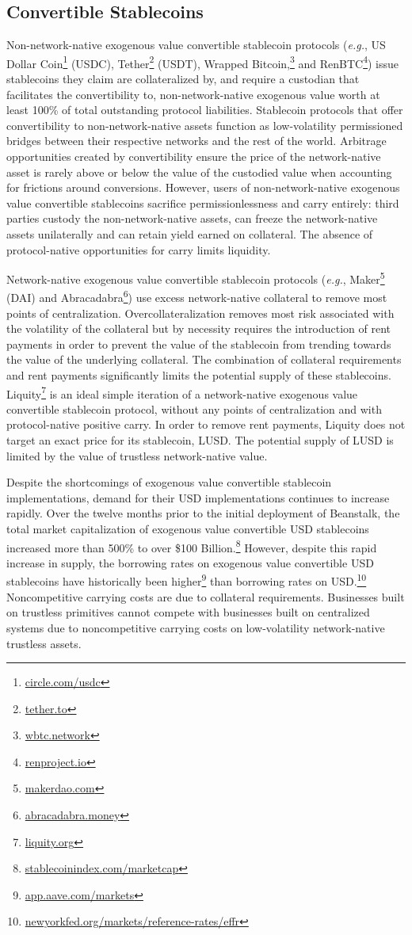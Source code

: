 \documentclass[tikz]{article}
\newcommand{\term}[1]{\textsl{#1}}
\newcommand{\fref}[1]{\footnote{\href{http://#1}{#1}}}
\begin{document}
\subsection{Convertible Stablecoins}
Non-network-native exogenous value convertible stablecoin protocols (\term{e.g.}, US Dollar Coin\fref{circle.com/usdc} (USDC), Tether\fref{tether.to} (USDT), Wrapped Bitcoin,\fref{wbtc.network} and RenBTC\fref{renproject.io}) issue stablecoins they claim are collateralized by, and require a custodian that facilitates the convertibility to, non-network-native exogenous value worth at least 100\% of total outstanding protocol liabilities. Stablecoin protocols that offer convertibility to non-network-native assets function as low-volatility permissioned bridges between their respective networks and the rest of the world. Arbitrage opportunities created by convertibility ensure the price of the network-native asset is rarely above or below the value of the custodied value when accounting for frictions around conversions. However, users of non-network-native exogenous value convertible stablecoins sacrifice permissionlessness and carry entirely: third parties custody the non-network-native assets, can freeze the network-native assets unilaterally and can retain yield earned on collateral. The absence of protocol-native opportunities for carry limits liquidity.

\newpage
Network-native exogenous value convertible stablecoin protocols (\term{e.g.}, Maker\fref{makerdao.com} (DAI) and Abracadabra\fref{abracadabra.money}) use excess network-native collateral to remove most points of centralization. Overcollateralization removes most risk associated with the volatility of the collateral but by necessity requires the introduction of rent payments in order to prevent the value of the stablecoin from trending towards the value of the underlying collateral. The combination of collateral requirements and rent payments significantly limits the potential supply of these stablecoins. Liquity\fref{liquity.org} is an ideal simple iteration of a network-native exogenous value convertible stablecoin protocol, without any points of centralization and with protocol-native positive carry. In order to remove rent payments, Liquity does not target an exact price for its stablecoin, LUSD. The potential supply of LUSD is limited by the value of trustless network-native value. 

Despite the shortcomings of exogenous value convertible stablecoin implementations, demand for their USD implementations continues to increase rapidly. Over the twelve months prior to the initial deployment of Beanstalk, the total market capitalization of exogenous value convertible USD stablecoins increased more than 500\% to over \$100 Billion.\fref{stablecoinindex.com/marketcap} However, despite this rapid increase in supply, the borrowing rates on exogenous value convertible USD stablecoins have historically been higher\fref{app.aave.com/markets} than borrowing rates on USD.\fref{newyorkfed.org/markets/reference-rates/effr} Noncompetitive carrying costs are due to collateral requirements. Businesses built on trustless primitives cannot compete with businesses built on centralized systems due to noncompetitive carrying costs on low-volatility network-native trustless assets.
\end{document}
